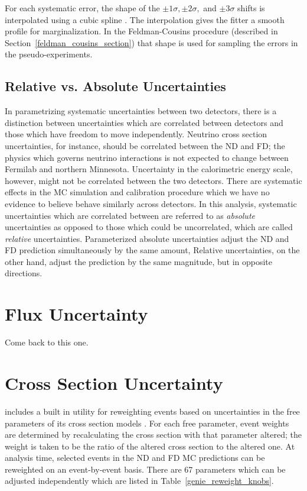 For each systematic error, the shape of the
$\pm 1\sigma, \pm2\sigma,$ and
$\pm3\sigma$ shifts is interpolated using a cubic spline
\cite{atkinson1978introduction}.
The interpolation gives the fitter a smooth profile for marginalization.
In the Feldman-Cousins procedure \cite{feldman1998unified} (described
in Section~\ref{feldman_cousins_section}) that shape
is used for sampling the errors in the pseudo-experiments.

\subsection{Relative vs. Absolute Uncertainties}

In parametrizing systematic uncertainties between two detectors,
there is a distinction between uncertainties which are
correlated between detectors and those which have freedom to
move independently.
Neutrino cross section uncertainties, for instance, should be correlated
between the ND and FD; the physics which governs neutrino interactions
is not expected to change between Fermilab and northern Minnesota.
Uncertainty in the calorimetric energy scale, however,
might not be correlated between the two detectors.
There are systematic effects in the MC simulation and calibration procedure
which we have no evidence to believe behave similarly across
detectors.
In this analysis, systematic uncertainties which are correlated between
are referred to as \textit{absolute} uncertainties as opposed to
those which could be uncorrelated, which are called \textit{relative}
uncertainties.
Parameterized absolute uncertainties adjust the ND and FD prediction
simultaneously by the same amount,
Relative uncertainties, on the other hand, adjust the prediction by
the same magnitude, but in opposite directions.


\section{Flux Uncertainty}
\label{flux_syst_section}

Come back to this one.


\section{Cross Section Uncertainty}

\genie includes a built in utility for reweighting events based on
uncertainties in the free parameters of its cross section models
\cite{genie}.
For each free parameter, event weights are determined by recalculating the
cross section with that parameter altered;
the weight is taken to be the ratio of the altered cross section
to the altered one.
At analysis time, selected events in the ND and FD MC predictions can be
reweighted on an event-by-event basis.
There are 67 parameters which can be adjusted independently which are listed
in Table~\ref{genie_reweight_knobs}.

